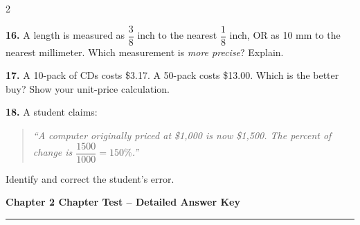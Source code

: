 \documentclass[11pt]{article}
\newcommand{\workspace}[1][3.5cm]{\vspace{#1}}
\begin{document}
\begin{multicols}{2}
\workspace[3.5cm]

\textbf{16.} \; A length is measured as $\dfrac{3}{8}$ inch to the nearest
$\dfrac{1}{8}$ inch, OR as 10 mm to the nearest millimeter. Which measurement
is \textit{more precise}? Explain.

\workspace[3.5cm]

\textbf{17.} \; A 10-pack of CDs costs \$3.17. A 50-pack costs \$13.00.
Which is the better buy? Show your unit-price calculation.

\workspace[3.5cm]

\textbf{18.} \; A student claims:

\begin{quote}
  \textit{``A computer originally priced at \$1,000 is now \$1,500.
  The percent of change is $\dfrac{1500}{1000} = 150\%$.''}
\end{quote}

Identify and correct the student's error.

\workspace[3.5cm]

\end{multicols}

\newpage
\begin{center}
  {\Large\textbf{Chapter 2 Chapter Test -- Detailed Answer Key}}
\end{center}
\hrule
\vspace{0.4cm}
\end{document}
